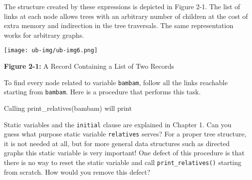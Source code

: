 
The structure created by these expressions is depicted in Figure 2-1.
The list of links at each node allows trees with an arbitrary number of
children at the cost of extra memory and indirection in the tree
traversals. The same representation works for arbitrary
graphs.



\begin{center}
\texttt{[image: ub-img/ub-img6.png]}
\end{center}

{\sffamily\bfseries Figure 2-1:}
{\sffamily A Record Containing a List of Two Records}

\bigskip

To find every node related to variable \texttt{bambam}, follow all the
links reachable starting from \texttt{bambam}. Here is a procedure that
performs this task.


Calling print\_relatives(bambam) will print


Static variables and the \texttt{initial} clause are explained in
Chapter 1. Can you guess what purpose static variable
\texttt{relatives} serves? For a proper tree structure, it is not
needed at all, but for more general data structures such as directed
graphs this static variable is very important! One defect of this
procedure is that there is no way to reset the static variable and call
\texttt{print\_relatives()} starting from scratch. How would you remove
this defect?

